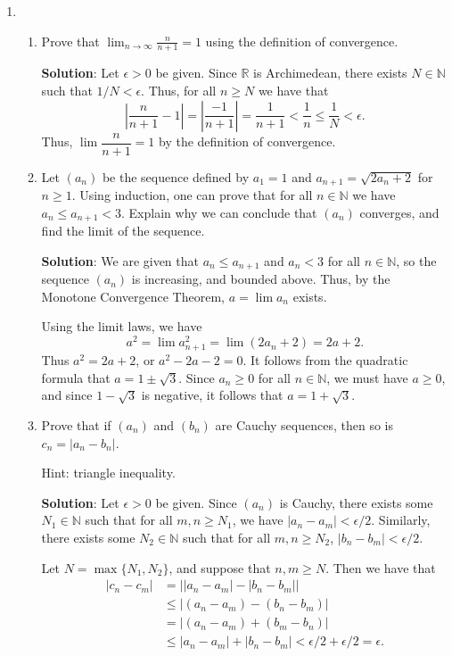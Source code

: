 \documentclass[12pt]{article}
\newcommand{\points}[1]{\marginpar{\hspace{24pt}[#1]}}
\newcommand{\di}{\displaystyle}
\newcommand{\R}{\mathbb{R}}
\newcommand{\N}{\mathbb{N}}
\newcommand{\abs}[1]{\lvert #1\rvert}
\begin{document}
\begin{enumerate}
\item \begin{enumerate}
       \item Prove that $\di \lim_{n\to\infty}\frac{n}{n+1} = 1$ using the definition of convergence. \points{4}

\bigskip

{\bf Solution}: Let $\epsilon>0$ be given. Since $\R$ is Archimedean, there exists $N\in\N$ such that $1/N<\epsilon$. Thus, for all $n\geq N$ we have that
\[
 \left|\frac{n}{n+1}-1\right| = \left|\frac{-1}{n+1}\right| = \frac{1}{n+1}<\frac{1}{n}\leq \frac{1}{N}<\epsilon.
\]
Thus, $\lim\dfrac{n}{n+1} = 1$ by the definition of convergence.


\newpage

      \item Let $(a_n)$ be the sequence defined by $a_1=1$ and $a_{n+1} = \sqrt{2a_n+2}$ for $n\geq 1$. Using induction, one can prove that for all $n\in\N$ we have $a_n\leq a_{n+1} <3$. Explain why we can conclude that $(a_n)$ converges, and find the limit of the sequence. \points{3}


\bigskip

{\bf Solution}: We are given that $a_n\leq a_{n+1}$ and $a_n<3$ for all $n\in \N$, so the sequence $(a_n)$ is increasing, and bounded above. Thus, by the Monotone Convergence Theorem, $a=\lim a_n$ exists.

Using the limit laws, we have
\[
 a^2 = \lim a_{n+1}^2 = \lim (2a_n+2) = 2a+2.
\]
Thus $a^2=2a+2$, or $a^2-2a-2=0$. It follows from the quadratic formula that $a = 1\pm \sqrt{3}$. Since $a_n\geq 0$ for all $n\in\N$, we must have $a\geq 0$, and since $1-\sqrt{3}$ is negative, it follows that $a=1+\sqrt{3}$.

\bigskip

      \item Prove that if $(a_n)$ and $(b_n)$ are Cauchy sequences, then so is $c_n=\abs{a_n-b_n}$. \points{3}

Hint: triangle inequality.


\bigskip

{\bf Solution}: Let $\epsilon>0$ be given. Since $(a_n)$ is Cauchy, there exists some $N_1\in\N$ such that for all $m,n\geq N_1$, we have $\abs{a_n-a_m}<\epsilon/2$. Similarly, there exists some $N_2\in\N$ such that for all $m,n\geq N_2$, $\abs{b_n-b_m}<\epsilon/2$.

Let $N=\max\{N_1,N_2\}$, and suppose that $n,m\geq N$. Then we have that
\begin{align*}
 \abs{c_n-c_m} & = \abs{\abs{a_n-a_m}-\abs{b_n-b_m}}\\
&\leq \abs{(a_n-a_m)-(b_n-b_m)}\\
& = \abs{(a_n-a_m)+(b_m-b_n)}\\
&\leq \abs{a_n-a_m}+\abs{b_n-b_m} <\epsilon/2+\epsilon/2 = \epsilon.
\end{align*}

      \end{enumerate}



\end{enumerate}
\end{document}
